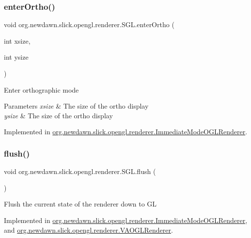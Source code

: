 \subsubsection{\texorpdfstring{enter\+Ortho()}{enterOrtho()}}
{\footnotesize\ttfamily void org.\+newdawn.\+slick.\+opengl.\+renderer.\+S\+G\+L.\+enter\+Ortho (\begin{DoxyParamCaption}\item[{int}]{xsize,  }\item[{int}]{ysize }\end{DoxyParamCaption})}

Enter orthographic mode


\begin{DoxyParams}{Parameters}
{\em xsize} & The size of the ortho display \\
\hline
{\em ysize} & The size of the ortho display \\
\hline
\end{DoxyParams}


Implemented in \mbox{\hyperlink{classorg_1_1newdawn_1_1slick_1_1opengl_1_1renderer_1_1_immediate_mode_o_g_l_renderer_a80452e864cb2656b20684c65dc219014}{org.\+newdawn.\+slick.\+opengl.\+renderer.\+Immediate\+Mode\+O\+G\+L\+Renderer}}.

\mbox{\label{interfaceorg_1_1newdawn_1_1slick_1_1opengl_1_1renderer_1_1_s_g_l_a97c40969d74b57d2df86421d53b9c55c}} 
\subsubsection{\texorpdfstring{flush()}{flush()}}
{\footnotesize\ttfamily void org.\+newdawn.\+slick.\+opengl.\+renderer.\+S\+G\+L.\+flush (\begin{DoxyParamCaption}{ }\end{DoxyParamCaption})}

Flush the current state of the renderer down to GL 

Implemented in \mbox{\hyperlink{classorg_1_1newdawn_1_1slick_1_1opengl_1_1renderer_1_1_immediate_mode_o_g_l_renderer_afe7b9f862d9e3c25ade32c1de777577b}{org.\+newdawn.\+slick.\+opengl.\+renderer.\+Immediate\+Mode\+O\+G\+L\+Renderer}}, and \mbox{\hyperlink{classorg_1_1newdawn_1_1slick_1_1opengl_1_1renderer_1_1_v_a_o_g_l_renderer_aac1c130db1e7fbe52a5beb3a4f9f3186}{org.\+newdawn.\+slick.\+opengl.\+renderer.\+V\+A\+O\+G\+L\+Renderer}}.

